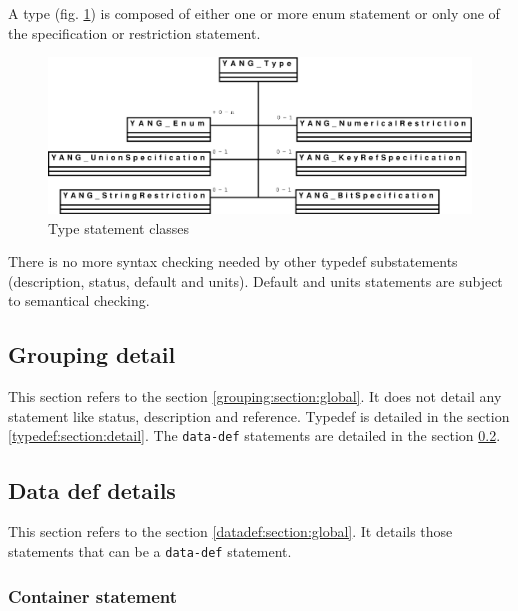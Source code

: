 \documentclass[a4paper]{article}
\begin{document}
 A  type (fig.  \ref{type}) is  composed of  either one  or  more enum
 statement or only one of the specification or restriction statement.
\begin{figure}[htbp]
\begin{center}
\includegraphics[scale = .3]{type.eps}
\end{center}
\caption{Type statement classes}
\label{type}
\end{figure}

There  is   no  more  syntax   checking  needed  by   other  typedef
substatements  (description, status, default  and units).  Default and
units statements are subject to semantical checking.

\subsection{Grouping detail}
\label{grouping:section:details}

This section  refers to the  section \ref{grouping:section:global}. It
does not  detail any statement  like status, description  and reference.
Typedef is detailed  in the section \ref{typedef:section:detail}.  The
{\tt    data-def}   statements   are    detailed   in    the   section
\ref{datadef:section:detail}.

\subsection{Data def details}
\label{datadef:section:detail}

This  section refers to  the section  \ref{datadef:section:global}. It
details those statements that can be a {\tt data-def} statement.

\subsubsection{Container statement}
\end{document}
